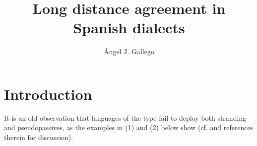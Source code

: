 \documentclass[output=paper]{langsci/langscibook}
\author{Ángel J. Gallego\affiliation{Universitat Autònoma de Barcelona}}
\title{Long distance agreement in Spanish dialects}
\begin{document}
 

 

 

 

 

 

 

 

 

 

 


\section{Introduction}%

It is an old observation that languages of the  type fail to deploy both  stranding and pseudopassives, as the examples in (1) and (2) below show (cf. \citealt{Law2006} and references therein for discussion). 

    \z
\end{document}
